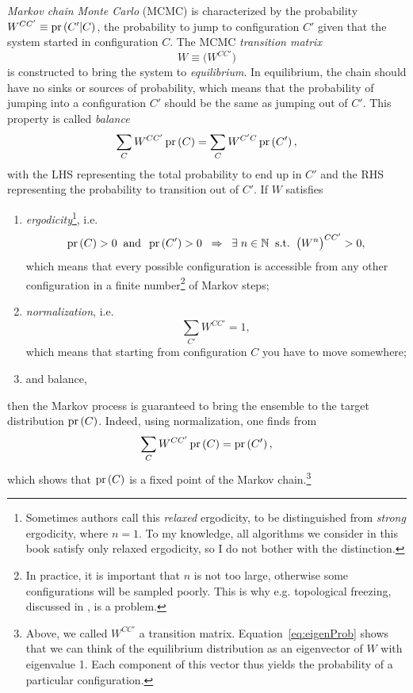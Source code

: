 {\it Markov chain Monte Carlo} (MCMC) is characterized by the probability 
$W^{CC'}\equiv\pr{C'|C}$, the probability to jump to configuration 
$C'$ given that the system started in configuration $C$.
The MCMC {\it transition matrix}
\begin{equation}
  W\equiv\Big(W^{CC'}\Big)
\end{equation}
is constructed to bring the system to {\it equilibrium}.
In equilibrium, the chain should have no sinks or sources of probability,
which means that the probability of jumping into a configuration $C'$
should be the same as jumping out of $C'$. This property
is called {\it balance}
\begin{equation}\label{eq:balance}
    \sum\limits_CW^{CC'}\pr{C}=
    \sum\limits_CW^{C'C}\pr{C'},
\end{equation}
with the LHS representing the total probability to end up in $C'$ and
the RHS representing the probability to transition out of $C'$.
If $W$ satisfies
\begin{enumerate}
  \item {\it ergodicity}\footnote{Sometimes authors call this
        {\it relaxed} ergodicity, to be distinguished from {\it strong}
        ergodicity, where $n=1$. To my knowledge, all algorithms we consider
        in this book satisfy only relaxed ergodicity, so I do not bother
        with the distinction.}, i.e.
        \begin{equation}\label{eq:ergodicity}
          \pr{C}>0\;\;\text{and}\;\;\pr{C'}>0\;\;\Rightarrow\;\;
          \exists\;n\in\N\;\;\text{s.t.}\;\;\big(W^n\big)^{CC'}>0,
        \end{equation}
        which means that every possible configuration is accessible from
        any other configuration in a finite number\footnote{In practice,
        it is important that $n$ is not too large, otherwise some configurations
        will be sampled poorly. This is why e.g.
        topological freezing, discussed
        in , is a problem.} of Markov steps;
  \item {\it normalization}, i.e.
        \begin{equation}
          \sum\limits_{C'}W^{CC'}=1,
        \end{equation}
        which means that starting from configuration $C$ you have
        to move somewhere;
  \item and balance, 
\end{enumerate}
then the Markov process is guaranteed to bring the ensemble to the
target distribution $\pr{C}$. Indeed, using normalization, 
one finds from 
\begin{equation}\label{eq:eigenProb}
    \sum\limits_CW^{CC'}\pr{C}=\pr{C'},
\end{equation}
which shows that $\pr{C}$ is a fixed point of
the Markov chain.\footnote{Above, we called $W^{CC'}$ a transition matrix.
Equation~\eqref{eq:eigenProb} shows that we can think of the equilibrium
distribution as an eigenvector of $W$ with eigenvalue 1. Each component
of this vector thus yields the probability of a particular configuration.} 

